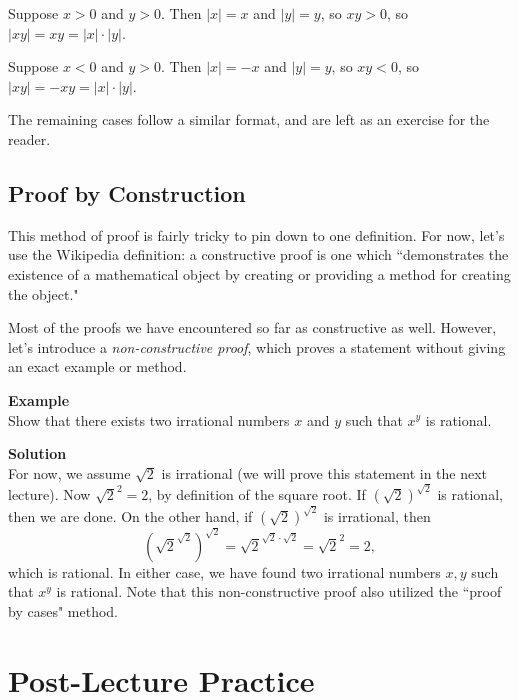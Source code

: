 \documentclass{article}
\begin{document}
    \begin{Cases}
        \item Suppose $x > 0$ and $y > 0$. Then $|x| = x$ and $|y| = y$, so $xy > 0$, so $|xy| = xy = |x| \cdot |y|$.
        \item Suppose $x < 0$ and $y > 0$. Then $|x| = -x$ and $|y| = y$, so $xy < 0$, so $|xy| = -xy = |x| \cdot |y|$.
    \end{Cases}
    The remaining cases follow a similar format, and are left as an exercise for the reader.
    
\subsection*{Proof by Construction}
    This method of proof is fairly tricky to pin down to one definition. For now, let's use the Wikipedia definition: a constructive proof is one which ``demonstrates the existence of a mathematical object by creating or providing a method for creating the object."
    
    \vspace{1.5mm}
    Most of the proofs we have encountered so far as constructive as well. However, let's introduce a \textit{non-constructive proof}, which proves a statement without giving an exact example or method.
    
    \vspace{1.5mm}
    \textbf{Example} \\
    Show that there exists two irrational numbers $x$ and $y$ such that $x^{y}$ is rational.
    
    \vspace{1.5mm}
    \textbf{Solution} \\
    For now, we assume $\sqrt{2}$ is irrational (we will prove this statement in the next lecture). Now $\sqrt{2}^{2} = 2$, by definition of the square root. If $(\sqrt{2})^{\sqrt{2}}$ is rational, then we are done. On the other hand, if $(\sqrt{2})^{\sqrt{2}}$ is irrational, then $$\left(\sqrt{2}^{\sqrt{2}}\right)^{\sqrt{2}} = \sqrt{2}^{\sqrt{2} \cdot \sqrt{2}} = \sqrt{2}^{2} = 2,$$ which is rational. In either case, we have found two irrational numbers $x, y$ such that $x^{y}$ is rational. Note that this non-constructive proof also utilized the ``proof by cases" method.
    
\section*{Post-Lecture Practice}
\end{document}
